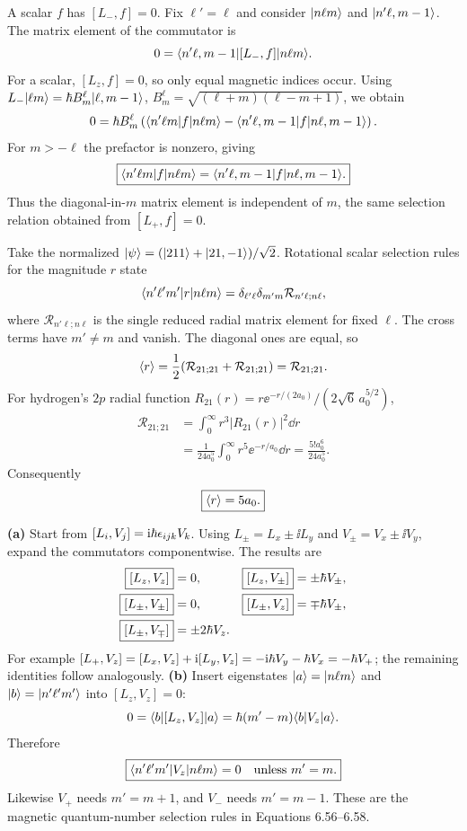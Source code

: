 A scalar $f$ has $[L_-,f]=0$.
Fix $\ell'=\ell$ and consider
$\lvert n\ell m\rangle$ and $\lvert n'\ell,m-1\rangle$.
The matrix element of the commutator is
\[
0=\langle n'\ell,m-1\rvert[L_-,f]
\lvert n\ell m\rangle.
\]
For a scalar, $[L_z,f]=0$, so only
equal magnetic indices occur.
Using
$L_-\lvert \ell m\rangle=
\hbar B^\ell_m\lvert \ell,m-1\rangle$,
$B^\ell_m=\sqrt{(\ell+m)(\ell-m+1)}$,
we obtain
\[
0=\hbar B^\ell_m
\left(
\langle n'\ell m\rvert f\lvert n\ell m\rangle
-\langle n'\ell,m-1\rvert f\lvert n\ell,m-1\rangle
\right).
\]
For $m>-\ell$ the prefactor is
nonzero, giving
\begin{equation}
\boxed{\langle n'\ell m\rvert f\lvert n\ell m\rangle
=\langle n'\ell,m-1\rvert f\lvert n\ell,m-1\rangle.}
\end{equation}
Thus the diagonal-in-$m$ matrix element
is independent of $m$, the same
selection relation obtained from
$[L_+,f]=0$.

Take the normalized
$\lvert \psi\rangle=(\lvert 211\rangle+\lvert 21,-1\rangle)/\sqrt2$.
Rotational scalar selection rules
for the magnitude $r$ state
\[
\langle n'\ell'm'\rvert r\lvert n\ell m\rangle
=\delta_{\ell'\ell}\delta_{m'm}
\mathcal R_{n'\ell;n\ell},
\]
where $\mathcal R_{n'\ell;n\ell}$
is the single reduced radial
matrix element for fixed $\ell$.
The cross terms have $m'\ne m$ and
vanish. The diagonal ones are equal,
so
\[
\langle r\rangle=\frac12(\mathcal R_{21;21}
+\mathcal R_{21;21})=\mathcal R_{21;21}.
\]
For hydrogen's $2p$ radial function
$R_{21}(r)=
r\ee^{-r/(2a_0)}/(2\sqrt6\,a_0^{5/2})$,
\begin{align}
\mathcal R_{21;21}
&=\int_0^\infty
r^3|R_{21}(r)|^2\dd r\\
&=\frac1{24a_0^5}
\int_0^\infty r^5\ee^{-r/a_0}\dd r
=\frac{5!a_0^6}{24a_0^5}.
\end{align}
Consequently
\begin{equation}
\boxed{\langle r\rangle=5a_0.}
\end{equation}

\textbf{(a)} Start from
$[L_i,V_j]=\mathrm i\hbar\epsilon_{ijk}V_k$.
Using $L_\pm=L_x\pm\ii L_y$
and $V_\pm=V_x\pm\ii V_y$,
expand the commutators componentwise.
The results are
\begin{align}
\boxed{[L_z,V_z]}&=0,&
\boxed{[L_z,V_\pm]}&=\pm\hbar V_\pm,\\
\boxed{[L_\pm,V_\pm]}&=0,&
\boxed{[L_\pm,V_z]}&=\mp\hbar V_\pm,\\
\boxed{[L_\pm,V_\mp]}&=\pm2\hbar V_z.
\end{align}
For example
$[L_+,V_z]=[L_x,V_z]
+\mathrm i[L_y,V_z]=-\mathrm i\hbar V_y-\hbar V_x
=-\hbar V_+$; the remaining identities
follow analogously.
\textbf{(b)} Insert eigenstates
$\lvert a\rangle=\lvert n\ell m\rangle$ and
$\lvert b\rangle=\lvert n'\ell'm'\rangle$
into $[L_z,V_z]=0$:
\[
0=\langle b\rvert[L_z,V_z]\lvert a\rangle
=\hbar(m'-m)\langle b\rvert V_z\lvert a\rangle.
\]
Therefore
\begin{equation}
\boxed{\langle n'\ell'm'\rvert V_z\lvert n\ell m\rangle
=0\quad\text{unless }m'=m.}
\end{equation}
Likewise $V_+$ needs $m'=m+1$,
and $V_-$ needs $m'=m-1$.
These are the magnetic quantum-number
selection rules in Equations 6.56--6.58.

